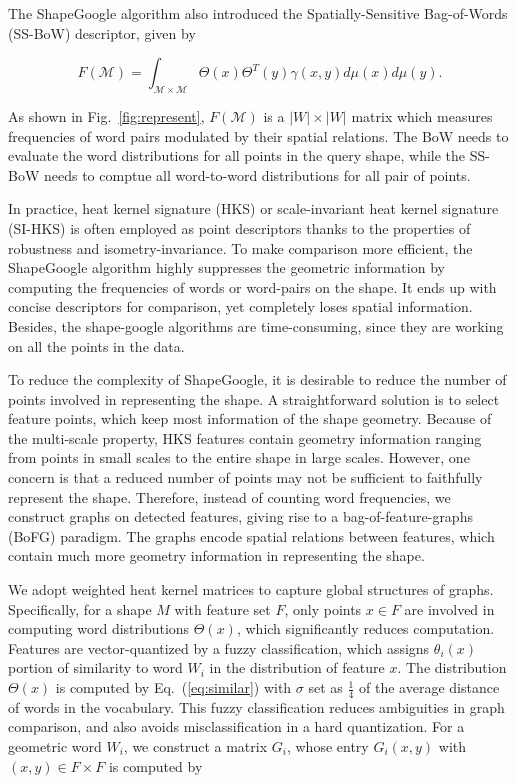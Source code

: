 The ShapeGoogle algorithm also introduced the Spatially-Sensitive Bag-of-Words (SS-BoW)
descriptor, given by

\begin{equation}
F(\mathcal{M})=\int_{\mathcal{M}\times\mathcal{M}}\Theta(x)\Theta^T(y)\gamma(x,y)d\mu(x)d\mu(y).
\end{equation}

As shown in Fig.~\ref{fig:represent}, $F(\mathcal{M})$ is a $|W|\times|W|$ matrix which 
measures frequencies of word pairs modulated by their spatial relations. The BoW needs 
to evaluate the word distributions for all points in the query shape, while the 
SS-BoW needs to comptue all word-to-word distributions for all pair of points.

In practice, heat kernel signature (HKS) or scale-invariant heat kernel signature (SI-HKS) is often 
employed as point descriptors thanks to the properties of robustness and isometry-invariance.  
To make comparison more efficient, the ShapeGoogle algorithm highly suppresses the geometric 
information by computing the frequencies of words or word-pairs on the shape. It ends up with concise descriptors for comparison, 
yet completely loses spatial information. Besides, the shape-google algorithms are time-consuming, 
since they are working on all the points in the data. 

To reduce the complexity of ShapeGoogle, it is desirable to reduce the number of points involved 
in representing the shape. A straightforward solution is to select feature points, which keep most 
information of the shape geometry. Because of the multi-scale property, HKS features contain geometry 
information ranging from points in small scales to the entire shape in large scales. However, one concern 
is that a reduced number of points may not be sufficient to faithfully represent the shape. Therefore, 
instead of counting word frequencies, we construct graphs on detected features, giving rise to a 
bag-of-feature-graphs (BoFG) paradigm. The graphs encode spatial relations between features, which contain 
much more geometry information in representing the shape.

We adopt weighted heat kernel matrices to capture global structures of graphs. Specifically, for a shape $M$ with 
feature set $F$, only points $x\in F$ are involved in computing word distributions $\Theta(x)$, which significantly reduces 
computation. Features are vector-quantized by a fuzzy classification, which assigns $\theta_i(x)$ portion of similarity 
to word $W_i$ in the distribution of feature $x$. The distribution $\Theta(x)$ is computed by Eq.~(\ref{eq:similar}) 
with $\sigma$ set as $\frac{1}{4}$ of the average distance of words in the vocabulary. This fuzzy classification reduces 
ambiguities in graph comparison, and also avoids misclassification in a hard quantization. For a geometric word $W_i$, we 
construct a matrix $G_i$, whose entry $G_i(x,y)$ with $(x,y)\in F\times F$ is computed by

